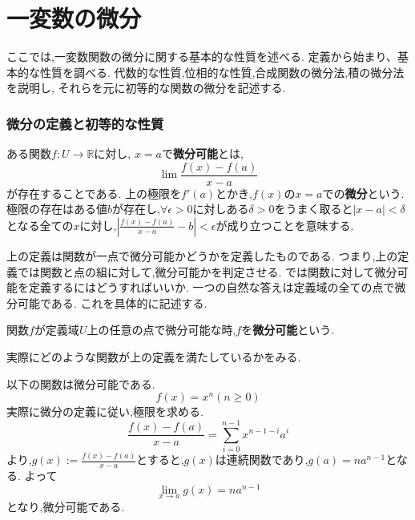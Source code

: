 \part{一変数の微分}
ここでは,一変数関数の微分に関する基本的な性質を述べる.
定義から始まり、基本的な性質を調べる.
代数的な性質,位相的な性質,合成関数の微分法,積の微分法を説明し,
それらを元に初等的な関数の微分を記述する.
\section{微分の定義と初等的な性質}

\begin{screen}
\begin{dfn}[微分]
ある関数$f:U \to \mathbb{R}$に対し,
$x=a$で\textbf{微分可能}とは,
\begin{equation*}
\lim \frac{f(x) - f(a)}{x-a}
\end{equation*}
が存在することである.
上の極限を$f'(a)$とかき,$f(x)$の$x=a$での\textbf{微分}という.
極限の存在はある値$b$が存在し,$\forall \epsilon > 0$に対しある$\delta > 0$をうまく取ると$|x - a| < \delta$となる全ての$x$に対し,$|\frac{f(x) - f(a)}{x-a} - b| < \epsilon$が成り立つことを意味する.
\end{dfn}
\end{screen}


上の定義は関数が一点で微分可能かどうかを定義したものである.
つまり,上の定義では関数と点の組に対して,微分可能かを判定させる.
では関数に対して微分可能を定義するにはどうすればいいか.
一つの自然な答えは定義域の全ての点で微分可能である.
これを具体的に記述する.
\begin{dfn}
関数$f$が定義域$U$上の任意の点で微分可能な時,$f$を\textbf{微分可能}という.
\end{dfn}


実際にどのような関数が上の定義を満たしているかをみる.


\begin{epl}
以下の関数は微分可能である.
\begin{equation*}
f(x) = x^n (n \ge 0)
\end{equation*}
実際に微分の定義に従い,極限を求める.
\begin{equation*}
\frac{f(x) - f(a)}{x-a}= \sum_{i=0}^{n-1} x^{n-1-i}a^i
\end{equation*}
より,$g(x):=\frac{f(x) - f(a)}{x-a}$とすると,$g(x)$は連続関数であり,$g(a) = na^{n-1}$となる.
よって
\begin{equation*}
\lim_{x \to a} g(x) = na^{n-1}
\end{equation*}
となり,微分可能である.
\end{epl}


